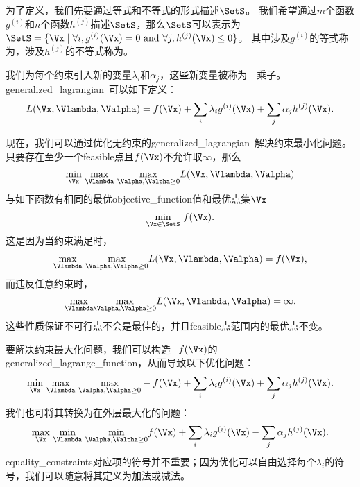 为了定义，我们先要通过等式和不等式的形式描述$\SetS$。 
我们希望通过$m$个函数$g^{(i)}$和$n$个函数$h^{(j)}$描述$\SetS$，那么$\SetS$可以表示为$\SetS = \{ \Vx \mid \forall i, g^{(i)}(\Vx) = 0 ~\text{and}~ \forall j, h^{(j)}(\Vx) \leq 0  \}$。
其中涉及$g^{(i)}$的等式称为，涉及$h^{(j)}$的不等式称为。

我们为每个约束引入新的变量$\lambda_i$和$\alpha_j$，这些新变量被称为~~乘子。\gls{generalized_lagrangian}~可以如下定义：
\begin{align}
 L(\Vx, \Vlambda, \Valpha) = f(\Vx) + \sum_i \lambda_i g^{(i)}(\Vx)  + \sum_j \alpha_j h^{(j)}(\Vx).
\end{align}

现在，我们可以通过优化无约束的\gls{generalized_lagrangian}~解决约束最小化问题。
只要存在至少一个\gls{feasible}点且$f(\Vx)$不允许取$\infty$，那么
\begin{align}
 \underset{\Vx}{\min}~  \underset{\Vlambda}{\max}~
 \underset{\Valpha, \Valpha \geq 0}{\max}   L(\Vx, \Vlambda, \Valpha) 
\end{align}
与如下函数有相同的最优\gls{objective_function}值和最优点集$\Vx$
\begin{align}
 \underset{\Vx \in \SetS}{\min}~ f(\Vx).
\end{align}
这是因为当约束满足时，
\begin{align}
  \underset{\Vlambda}{\max}~
 \underset{\Valpha, \Valpha \geq 0}{\max}   L(\Vx, \Vlambda, \Valpha)  = f(\Vx) ,
\end{align}
而违反任意约束时，
\begin{align}
  \underset{\Vlambda}{\max}  
 \underset{\Valpha, \Valpha \geq 0}{\max}   L(\Vx, \Vlambda, \Valpha)  = \infty .
\end{align}
这些性质保证不可行点不会是最佳的，并且\gls{feasible}点范围内的最优点不变。


要解决约束最大化问题，我们可以构造$-f(\Vx)$的\gls{generalized_lagrange_function}，从而导致以下优化问题：
\begin{align}
 \underset{\Vx}{\min}~ \underset{\Vlambda}{\max}  ~
 \underset{\Valpha, \Valpha \geq 0}{\max} 
  -f(\Vx) + \sum_i \lambda_i g^{(i)}(\Vx)  + \sum_j \alpha_j h^{(j)}(\Vx).
\end{align}
我们也可将其转换为在外层最大化的问题：
\begin{align}
 \underset{\Vx}{\max}~ \underset{\Vlambda}{\min}~
 \underset{\Valpha, \Valpha \geq 0}{\min} 
  f(\Vx) + \sum_i \lambda_i g^{(i)}(\Vx) - \sum_j \alpha_j h^{(j)}(\Vx).
\end{align}
\gls{equality_constraints}对应项的符号并不重要；因为优化可以自由选择每个$\lambda_i$的符号，我们可以随意将其定义为加法或减法。

